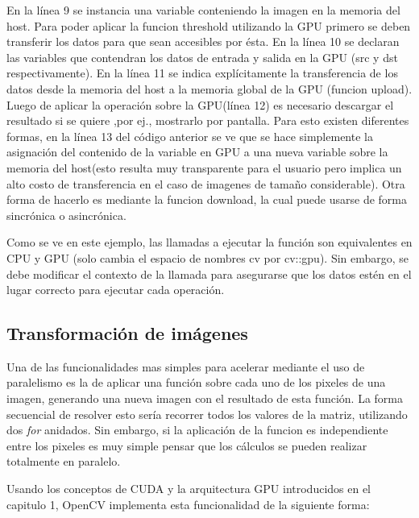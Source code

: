 \documentclass[a4paper,10pt]{report}
\begin{document}
En la línea 9 se instancia una variable conteniendo la imagen en la memoria del host. Para poder aplicar la funcion threshold utilizando la GPU primero se deben transferir los datos para que sean accesibles por ésta.
En la línea 10 se declaran las variables que contendran los datos de entrada y salida en la GPU (src y dst respectivamente).
En la línea 11 se indica explícitamente la transferencia de los datos desde la memoria del host a la memoria global de la GPU (funcion upload). 
Luego de aplicar la operación sobre la GPU(línea 12) es necesario descargar el resultado si se quiere ,por ej., mostrarlo por pantalla. 
Para esto existen diferentes formas, en la línea 13 del código anterior se ve que se hace simplemente la asignación del contenido de la variable en GPU a una nueva variable sobre la memoria del host(esto resulta muy transparente para el usuario pero implica un alto costo de transferencia en el caso de imagenes de tamaño considerable).
Otra forma de hacerlo es mediante la funcion download, la cual puede usarse de forma sincrónica o asincrónica.

Como se ve en este ejemplo, las llamadas a ejecutar la función son equivalentes en CPU y GPU (solo cambia el espacio de nombres cv por cv::gpu). 
Sin embargo, se debe modificar el contexto de la llamada para asegurarse que los datos estén en el lugar correcto para ejecutar cada operación.









\subsection{Transformación de imágenes}


Una de las funcionalidades mas simples para acelerar mediante el uso de paralelismo es la de aplicar una función sobre cada uno de los pixeles de una imagen, generando una nueva imagen con el resultado de esta función.
La forma secuencial de resolver esto sería recorrer todos los valores de la matriz, utilizando dos \textit{for} anidados. 
Sin embargo, si la aplicación de la funcion es independiente entre los pixeles es muy simple pensar que los cálculos se pueden realizar totalmente en paralelo.

Usando los conceptos de CUDA y la arquitectura GPU introducidos en el capitulo 1, OpenCV implementa esta funcionalidad de la siguiente forma:
\end{document}
